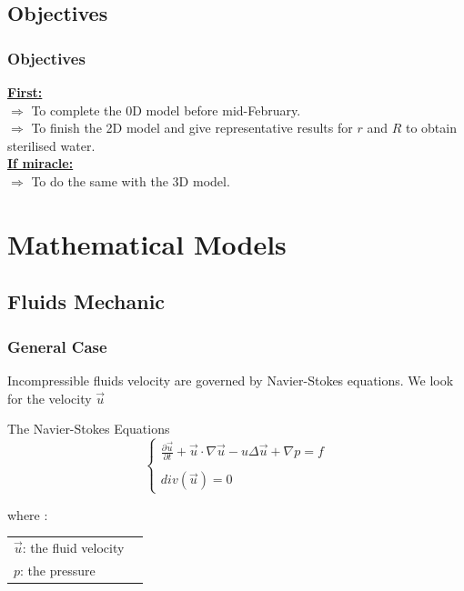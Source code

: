 \documentclass[xcolor=dvipsnames,10pt]{beamer}
\begin{document}
  \subsection{Objectives}
  \begin{frame}
  \frametitle{Objectives}
  \underline{\textbf{\color{blue}First:}}\\
  \vspace{5mm}
  $\Rightarrow$ To complete the 0D model before mid-February.\\
  \vspace{4mm}
  $\Rightarrow$ To finish the 2D model and give representative results for $r$ and $R$ to obtain sterilised water.\\
  \vspace{8mm}
  \underline{\textbf{\color{blue}If miracle:}}\\
  \vspace{5mm}
  $\Rightarrow$ To do the same with the 3D model.\end{frame}




  \section{Mathematical Models}

  \subsection{Fluids Mechanic}

  \begin{frame}
          \frametitle{General Case}
                  Incompressible fluids velocity are governed by Navier-Stokes equations. 
                  We look for the velocity $\vec{u}$ 
                  \begin{block}{The Navier-Stokes Equations}
                          \begin{equation}
                                  \left\{ \begin{array}{cl}
                                  \frac{\partial \vec{u}}{\partial t} + \vec{u}\cdot \nabla \vec{u} - u\Delta\vec{u} + \nabla p = f \\
                          \\
                                  div(\vec{u}) = 0
                                  \end{array}
                                  \right.
                          \end{equation}
                  \end{block}
                  where : 
          \begin{tabular}{ll}
                  $\vec{u}$: the fluid velocity\\
                  $p$: the pressure\\
          \end{tabular}
  \end{frame}
\end{document}

